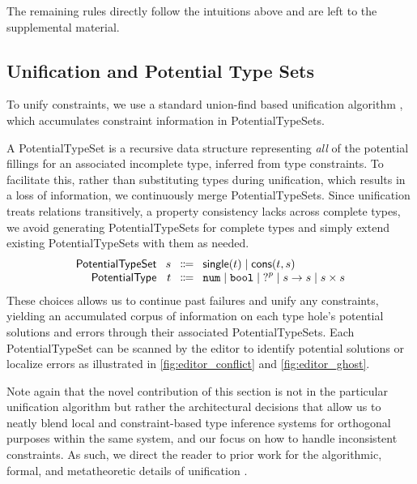 The remaining rules directly follow the intuitions above and are left to the supplemental material.

\subsection{Unification and Potential Type Sets}
\label{sec:unification}

To unify constraints, we use a standard union-find based unification algorithm \cite{huet1976, siek2008}, which accumulates constraint information in \textsf{PotentialTypeSet}s. 

A \textsf{PotentialTypeSet} is a recursive data structure representing \emph{all} of the potential fillings for an associated incomplete type, inferred from type constraints. To facilitate this, rather than  substituting types during unification, which results in a loss of information, we continuously merge \textsf{PotentialTypeSet}s. Since unification treats relations transitively, a property consistency lacks across complete types, we avoid generating \textsf{PotentialTypeSet}s for complete types and simply extend existing \textsf{PotentialTypeSet}s with them as needed.
%
\[\arraycolsep=4pt\begin{array}{rrcl}
\textsf{PotentialTypeSet} & s & \Coloneqq & \textsf{single}(t) \mid \textsf{cons}(t, s) \\
\textsf{PotentialType}    & t & \Coloneqq & \tnum \mid \tbool \mid \tehole^p \mid \tarr{s}{s} \mid \TProd{s}{s}
\end{array}\]
%
These choices allows us to continue past failures and unify any constraints, yielding an accumulated corpus of information on each type hole’s potential solutions and errors through their associated \textsf{PotentialTypeSet}s. Each \textsf{PotentialTypeSet} can be scanned by the editor to identify potential solutions or localize errors as illustrated in \cref{fig:editor_conflict} and \cref{fig:editor_ghost}.

Note again that the novel contribution of this section is not in the particular unification algorithm but rather the architectural decisions that allow us to neatly blend local and constraint-based type inference systems for orthogonal purposes within the same system, and our focus on how to handle inconsistent constraints. As such, we direct the reader to prior work for the algorithmic, formal, and metatheoretic details of unification \cite{siek2008}.

